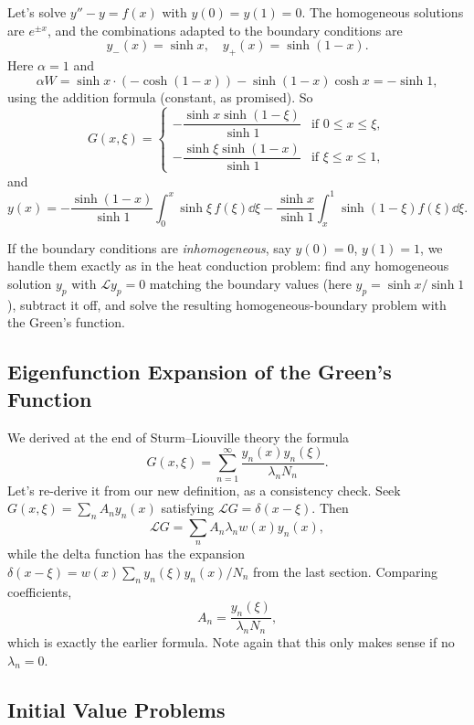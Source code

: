 \documentclass[a4paper]{scrartcl}
\begin{document}
\begin{example}
    Let's solve $y'' - y = f(x)$ with $y(0) = y(1) = 0$.
    The homogeneous solutions are $e^{\pm x}$, and the combinations adapted to the boundary conditions are
    $$
    y_-(x) = \sinh x, \quad y_+(x) = \sinh (1 - x).
    $$
    Here $\alpha = 1$ and
    $$
    \alpha W = \sinh x \cdot (-\cosh(1 - x)) - \sinh(1 - x) \cosh x = -\sinh 1,
    $$
    using the addition formula (constant, as promised). So
    $$
    G(x, \xi) = \begin{cases}
        -\dfrac{\sinh x \sinh (1 - \xi)}{\sinh 1} &\mbox{if } 0 \leq x \leq \xi, \\[2ex]
        -\dfrac{\sinh \xi \sinh(1 - x)}{\sinh 1} &\mbox{if } \xi \leq x \leq 1,
    \end{cases}
    $$
    and
    $$
    y(x) = -\frac{\sinh(1 - x)}{\sinh 1}\int_0^x \sinh \xi \, f(\xi) \dd \xi - \frac{\sinh x}{\sinh 1} \int_x^1 \sinh(1 - \xi) f(\xi) \dd \xi.
    $$
\end{example}

If the boundary conditions are \emph{inhomogeneous}, say $y(0) = 0$, $y(1) = 1$, we handle them exactly as in the heat conduction problem: find any homogeneous solution $y_p$ with $\mathcal{L}y_p = 0$ matching the boundary values (here $y_p = \sinh x/\sinh 1$), subtract it off, and solve the resulting homogeneous-boundary problem with the Green's function.

\subsection{Eigenfunction Expansion of the Green's Function}

We derived at the end of Sturm--Liouville theory the formula
$$
G(x, \xi) = \sum_{n = 1}^{\infty} \frac{y_n(x) y_n(\xi)}{\lambda_n N_n}.
$$
Let's re-derive it from our new definition, as a consistency check. Seek $G(x, \xi) = \sum_n A_n y_n(x)$ satisfying $\mathcal{L}G = \delta(x - \xi)$. Then
$$
\mathcal{L}G = \sum_n A_n \lambda_n w(x) y_n(x),
$$
while the delta function has the expansion $\delta(x - \xi) = w(x)\sum_n y_n(\xi) y_n(x)/N_n$ from the last section. Comparing coefficients,
$$
A_n = \frac{y_n(\xi)}{\lambda_n N_n},
$$
which is exactly the earlier formula. Note again that this only makes sense if no $\lambda_n = 0$.

\subsection{Initial Value Problems}
\end{document}
